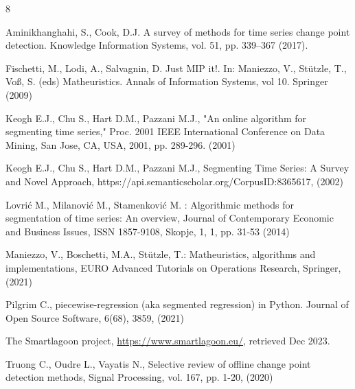 \documentclass[runningheads]{llncs}
\begin{document}
%
% 
% 
%
\begin{thebibliography}{8}

Aminikhanghahi, S., Cook, D.J. A survey of methods for time series change point detection. Knowledge Information Systems, vol. 51, pp. 339–367 (2017).   


Fischetti, M., Lodi, A., Salvagnin, D. Just MIP it!. In: Maniezzo, V., Stützle, T., Voß, S. (eds) Matheuristics. Annals of Information Systems, vol 10. Springer (2009)

Keogh E.J., Chu S., Hart D.M., Pazzani M.J., "An online algorithm for segmenting time series," Proc. 2001 IEEE International Conference on Data Mining, San Jose, CA, USA, 2001, pp. 289-296. (2001)

Keogh E.J., Chu S., Hart D.M., Pazzani M.J., Segmenting Time Series: A Survey and Novel Approach, https://api.semanticscholar.org/CorpusID:8365617, (2002)


Lovrić M., Milanović M., Stamenković M. : Algorithmic methods for segmentation of time series: An overview, Journal of Contemporary Economic and Business Issues, ISSN 1857-9108, Skopje, 1, 1, pp. 31-53  (2014)

Maniezzo, V., Boschetti, M.A., St\"utzle, T.: Matheuristics, algorithms and implementations, EURO Advanced Tutorials on Operations Research, Springer, (2021)

Pilgrim C., piecewise-regression (aka segmented regression) in Python. Journal of Open Source Software, 6(68), 3859, (2021)

The Smartlagoon project, \url{https://www.smartlagoon.eu/}, retrieved Dec 2023.

Truong C., Oudre L., Vayatis N., Selective review of offline change point detection methods, Signal Processing, vol. 167, pp. 1-20, (2020)
\end{thebibliography}
\end{document}

